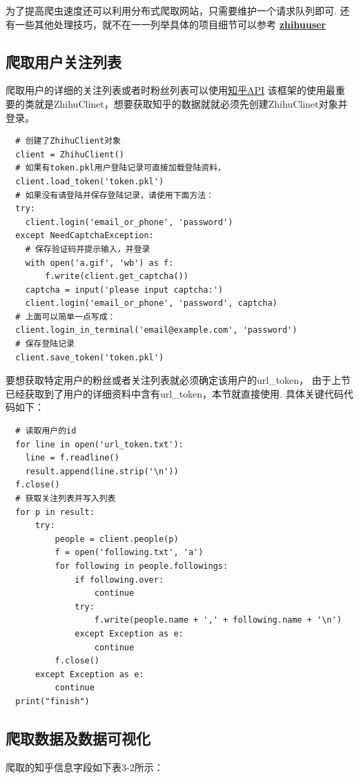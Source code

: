 \documentclass[bachelor,adobefonts]{jnuthesis}
\begin{document}

为了提高爬虫速度还可以利用分布式爬取网站，只需要维护一个请求队列即可.
还有一些其他处理技巧，就不在一一列举具体的项目细节可以参考
\textbf{\href{https://github.com/Dcwjh/Scrapy_zhuhuuser}{zhihuuser}}

\subsection{爬取用户关注列表}
爬取用户的详细的关注列表或者时粉丝列表可以使用\href{http://zhihu-oauth.readthedocs.io/zh_CN/latest/index.html}{知乎API}
该框架的使用最重要的类就是ZhihuClinet，想要获取知乎的数据就就必须先创建ZhihuClinet对象并登录。

\begin{lstlisting}
  # 创建了ZhihuClient对象
  client = ZhihuClient()
  # 如果有token.pkl用户登陆记录可直接加载登陆资料，
  client.load_token('token.pkl')
  # 如果没有请登陆并保存登陆记录，请使用下面方法：
  try:
    client.login('email_or_phone', 'password')
  except NeedCaptchaException:
    # 保存验证码并提示输入，并登录
    with open('a.gif', 'wb') as f:
        f.write(client.get_captcha())
    captcha = input('please input captcha:')
    client.login('email_or_phone', 'password', captcha)
  # 上面可以简单一点写成：
  client.login_in_terminal('email@example.com', 'password')
  # 保存登陆记录
  client.save_token('token.pkl')
\end{lstlisting}

要想获取特定用户的粉丝或者关注列表就必须确定该用户的url\_token，
由于上节已经获取到了用户的详细资料中含有url\_token，本节就直接使用.
具体关键代码代码如下：
\begin{lstlisting}
  # 读取用户的id
  for line in open('url_token.txt'):
    line = f.readline()
    result.append(line.strip('\n'))
  f.close()
  # 获取关注列表并写入列表
  for p in result:
      try:
          people = client.people(p)
          f = open('following.txt', 'a')
          for following in people.followings:
              if following.over:
                  continue
              try:
                  f.write(people.name + ',' + following.name + '\n')
              except Exception as e:
                  continue
          f.close()
      except Exception as e:
          continue 
  print("finish")
\end{lstlisting}

\subsection{爬取数据及数据可视化}
爬取的知乎信息字段如下表3-2所示：
\end{document}
